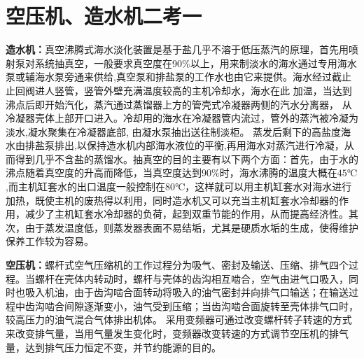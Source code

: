 \documentclass{ctexart}
\begin{document}
\section{空压机、造水机二考一}
\textbf{造水机：}真空沸腾式海水淡化装置是基于盐几乎不溶于低压蒸汽的原理，首先用喷射泵对系统抽真空，一般要求真空度在90\%以上，用来制淡水的海水通过专用海水泵或辅海水泵旁通来供给,真空泵和排盐泵的工作水也由它来提供。海水经过截止止回阀进人竖管，竖管外壁充满温度较高的主机冷却水，海水在此
加温，当达到沸点后即开始汽化，蒸汽通过蒸馏器上方的管壳式冷凝器两侧的汽水分离器， 从冷凝器壳体上部开口进入。冷却用的海水在冷凝器管内流过，管外的蒸汽被冷凝为淡水,凝水聚集在冷凝器底部, 由凝水泵抽出送往制淡柜。 蒸发后剩下的高盐度海水由排盐泵排出,以保持造水机内部海水液位的平衡,再用海水对蒸汽进行冷凝，从而得到几乎不含盐的蒸馏水。抽真空的目的主要有以下两个方面：首先，由于水的沸点随着真空度的升高而降低，当真空度达到90\%时，海水沸腾的温度大概在$45℃$,而主机缸套水的出口温度一般控制在$80℃$，这样就可以用主机缸套水对海水进行加热，既使主机的废热得以利用，同时造水机又可以充当主机缸套水冷却器的作用，减少了主机缸套水冷却器的负荷，起到双重节能的作用，从而提高经济性。其次，由于蒸发温度低，则蒸发器表面不易结垢，尤其是硬质水垢的生成，使得维护保养工作较为容易。 

\textbf{空压机：}螺杆式空气压缩机的工作过程分为吸气、密封及输送、压缩、排气四个过程。当螺杆在壳体内转动时，螺杆与壳体的齿沟相互啮合，空气由进气口吸入，同时也吸入机油，由于齿沟啮合面转动将吸入的油气密封并向排气口输送；在输送过程中齿沟啮合间隙逐渐变小，油气受到压缩；当齿沟啮合面旋转至壳体排气口时，较高压力的油气混合气体排出机体。     采用变频器可通过改变螺杆转子转速的方式来改变排气量，当用气量发生变化时，变频器改变转速的方式调节空压机的排气量，达到排气压力恒定不变，并节约能源的目的。
\end{document}
